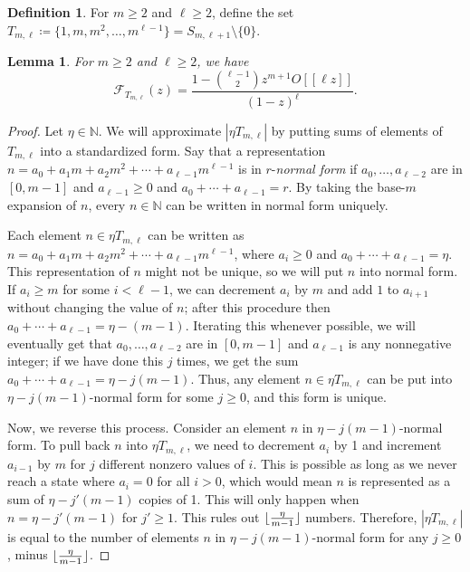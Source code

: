 \documentclass[10pt,a4paper]{article}
\newtheorem{lemma}[theorem]{Lemma}
\theoremstyle{definition}
\newtheorem{definition}[theorem]{Definition}
\theoremstyle{remark}
\numberwithin{equation}{section}
\numberwithin{theorem}{section}
\newcommand{\N}{\mathbb{N}}
\newcommand{\calf}{\mathcal{F}}
\DeclarePairedDelimiter{\floor}{\lfloor}{\rfloor}
\begin{document}
\begin{definition}
    For $m\geq 2$ and $\ell  \geq 2$, define the set $T_{m,\ell}\coloneq  \{1,m,m^2,\ldots,m^{\ell-1}\} = S_{m,\ell+1} \setminus \{0\}.$
\end{definition}

\begin{lemma}\label{lemmaHTML}
    For $m\geq 2$ and $\ell \geq 2$, we have 
    \[\calf_{T_{m,\ell}}(z) = \frac{1-\binom{\ell-1}{2}z^{m+1}O[[\ell z]]}{(1-z)^\ell}.\]
\end{lemma}

\begin{proof}
    Let $\eta \in \N$. We will approximate $|\eta T_{m,\ell}|$ by putting sums of elements of $T_{m,\ell}$ into a standardized form. Say that a representation $n = a_0 +a_1m + a_2m^2 + \cdots + a_{\ell-1}m^{\ell-1}$ is in $r$-\emph{normal form} if $a_0,\ldots,a_{\ell-2}$ are in $[0,m-1]$ and $a_{\ell-1} \geq 0$ and $a_0+\cdots + a_{\ell-1} = r$. By taking the base-$m$ expansion of $n$, every $n \in \N$ can be written in normal form uniquely.

    Each element $n \in \eta T_{m,\ell}$ can be written as $n = a_0 +a_1m + a_2m^2 + \cdots + a_{\ell-1}m^{\ell-1}$, where $a_i \geq 0$ and $a_0+\cdots + a_{\ell-1} = \eta $. This representation of $n$ might not be unique, so we will put $n$ into normal form. 
 If $a_i \geq m$ for some $i < \ell -1$, we can decrement $a_i$ by $m$ and add $1$ to $a_{i+1}$ without changing the value of $n$; after this procedure then $a_0+\cdots + a_{\ell-1} = \eta -(m-1)$. Iterating this whenever possible, we will eventually get that $a_0,\ldots,a_{\ell-2}$ are in $[0,m-1]$ and $a_{\ell-1}$ is any nonnegative integer; if we have done this $j$ times, we get the sum $a_0+\cdots + a_{\ell-1} = \eta -j(m-1)$. Thus, any element $n \in \eta T_{m,\ell}$ can be put into $\eta -j(m-1)$-normal form for some $j \geq 0$, and this form is unique.

    Now, we reverse this process. Consider an element $n$ in $\eta -j(m-1)$-normal form. To pull back $n$ into $\eta T_{m,\ell}$, we need to decrement $a_i$ by 1 and increment $a_{i-1}$ by $m$ for $j$ different nonzero values of $i$. This is possible as long as we never reach a state where $a_i = 0$ for all $i>0$, which would mean $n$ is represented as a sum of $\eta -j'(m-1)$ copies of 1. This will only happen when $n = \eta -j'(m-1)$ for $j' \geq 1$. This rules out $\floor{\frac{\eta }{m-1}}$ numbers. Therefore, $|\eta T_{m,\ell}|$ is equal to the number of elements $n$ in $\eta -j(m-1)$-normal form for any $j \geq 0$, minus $\floor{\frac{\eta }{m-1}}$.
    

\end{proof}
\end{document}
